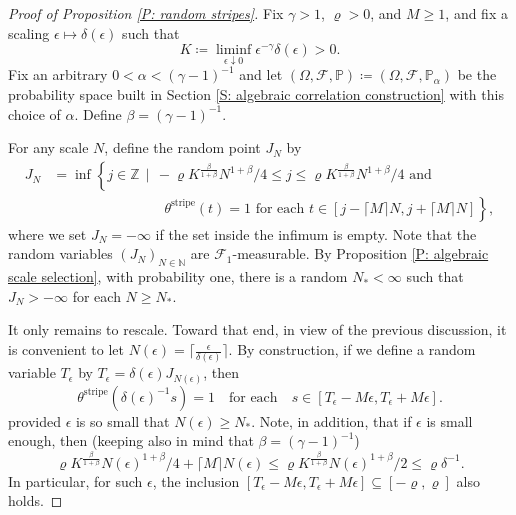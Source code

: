 \documentclass[10pt,a4paper]{amsart}
\begin{document}
	\begin{proof}[Proof of Proposition \ref{P: random stripes}] Fix $\gamma > 1$, $\varrho > 0$, and $M \geq 1$, and fix a scaling $\epsilon \mapsto \delta(\epsilon)$ such that 
		\begin{equation} \label{E: algebraic scaling}
			K\coloneqq \liminf_{\epsilon \downarrow 0} \epsilon^{-\gamma} \delta(\epsilon) > 0.
		\end{equation}
	Fix an arbitrary $0 < \alpha < (\gamma - 1)^{-1}$ and let $(\Omega,\mathcal{F},\mathbb{P}) \coloneqq (\Omega,\mathcal{F},\mathbb{P}_{\alpha})$ be the probability space built in Section \ref{S: algebraic correlation construction} with this choice of $\alpha$.  Define $\beta = (\gamma - 1)^{-1}$.
	
	For any scale $N$, define the random point $J_{N}$ by
		\begin{align*}
			J_{N} &= \inf \left\{ j \in \mathbb{Z} \, \mid \, - \varrho K^{\frac{\beta}{1 + \beta}} N^{1 + \beta}/4 \leq j \leq \varrho K^{\frac{\beta}{1 + \beta}} N^{1 + \beta}/4 \, \, \text{and} \, \,  \right. \\
				&\qquad \qquad \qquad \qquad \left. \theta^{\text{stripe}}(t) = 1 \, \, \text{for each} \, \, t \in [j - \lceil M \rceil N, j + \lceil M \rceil N] \right\},
		\end{align*}
	where we set $J_{N} = -\infty$ if the set inside the infimum is empty.  Note that the random variables $(J_{N})_{N \in \mathbb{N}}$ are $\mathcal{F}_{1}$-measurable.  By Proposition \ref{P: algebraic scale selection}, with probability one, there is a random $N_{*} < \infty$ such that $J_{N} > -\infty$ for each $N \geq N_{*}$.
	
	It only remains to rescale.  Toward that end, in view of the previous discussion, it is convenient to let $N(\epsilon) = \lceil \frac{\epsilon}{\delta(\epsilon)} \rceil$.  By construction, if we define a random variable $T_{\epsilon}$ by $T_{\epsilon} = \delta(\epsilon) J_{N(\epsilon)}$, then
		\begin{equation*}
			\theta^{\text{stripe}}(\delta(\epsilon)^{-1} s) = 1 \quad \text{for each} \quad s \in [T_{\epsilon} - M \epsilon, T_{\epsilon} + M \epsilon].
		\end{equation*}
	provided $\epsilon$ is so small that $N(\epsilon) \geq N_{*}$.  Note, in addition, that if $\epsilon$ is small enough, then (keeping also in mind that $ \beta = ( \gamma - 1 )^{-1} $)
		\begin{equation*}
			\varrho K^{\frac{\beta}{1 + \beta}} N(\epsilon)^{1 + \beta}/4 + \lceil M \rceil N(\epsilon) \leq \varrho K^{\frac{\beta}{1 + \beta}} N(\epsilon)^{1 + \beta} / 2 \leq \varrho \delta^{-1}.
		\end{equation*}
	In particular, for such $\epsilon$, the inclusion $[T_{\epsilon} - M \epsilon, T_{\epsilon} + M\epsilon] \subseteq [-\varrho,\varrho]$ also holds.
		\end{proof}
\end{document}
